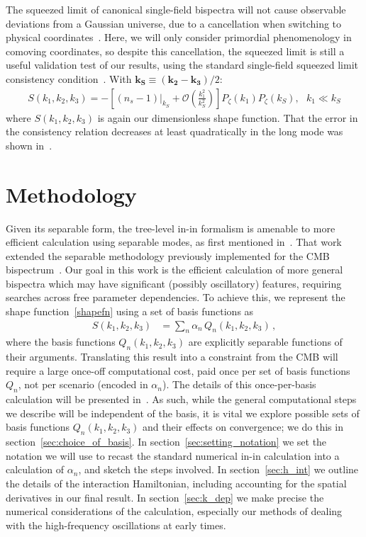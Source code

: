 \documentclass[a4paper,12pt]{extarticle}
\begin{document}
The squeezed limit of canonical single-field bispectra will not cause
observable deviations from a Gaussian universe,
due to a cancellation when switching to physical coordinates~\cite{Cabass_2016}.
Here, we will only consider primordial phenomenology
in comoving coordinates, so despite this cancellation,
the squeezed limit is still a useful validation test of our results,
using the standard single-field squeezed limit consistency condition~\cite{sqz_consistency,not_so_sqz}.
With $\mathbf{k_S}\equiv\left(\mathbf{k_2}-\mathbf{k_3}\right)/2 $:
\begin{align}\label{eq:sqz_consistency}
    S(k_1,k_2,k_3) = -\left[(n_s-1)|_{k_S}+\mathcal{O}\left(\frac{k_1^2}{k_S^2}\right)\right]P_{\zeta}(k_1)P_{\zeta}(k_S),
\ \ \  k_1\ll k_S
\end{align}
where $S(k_1,k_2,k_3)$ is again our dimensionless shape function.
That the error in the consistency relation decreases at least quadratically
in the long mode was shown in~\cite{not_so_sqz}.

\section{Methodology}\label{sec:methods}
Given its separable form, the tree-level in-in formalism is amenable
to more efficient calculation using separable modes, as first mentioned in~\cite{Funakoshi}.
That work extended the separable methodology previously implemented for the CMB bispectrum~\cite{FergShell_3}.
Our goal in this work is the efficient calculation of more general bispectra
which may have significant (possibly oscillatory) features, requiring searches across free parameter dependencies.
To achieve this, we represent the shape function~\eqref{shapefn} using a set of basis functions as
\begin{align}\label{goal}
S(k_1, k_2,k_3) &= \sum_n \alpha_n  \, Q_n(k_1,k_2,k_3)\,,
\end{align}
where the basis functions $Q_n(k_1,k_2,k_3)$ are explicitly separable functions of their arguments.
Translating this result into a constraint from the CMB
will require a large once-off computational cost, paid once
per set of basis functions $Q_n$,
not per scenario (encoded in $\alpha_n$).
The details of this once-per-basis calculation will be
presented in~\cite{Sohn_2020}.
As such, while the general computational steps we
describe will be independent of the basis, it is vital we
explore possible sets of basis functions $Q_n(k_1,k_2,k_3)$
and their effects on convergence;
we do this in section~\ref{sec:choice_of_basis}.
In section~\ref{sec:setting_notation} we set the notation we will use to recast
the standard numerical in-in calculation into a calculation of $\alpha_n$,
and sketch the steps involved.
In section~\ref{sec:h_int} we outline the details of the interaction Hamiltonian,
including accounting for the spatial derivatives in our final result.
In section~\ref{sec:k_dep} we make precise the numerical considerations
of the calculation,
especially our methods of dealing with the high-frequency
oscillations at early times.
\end{document}
